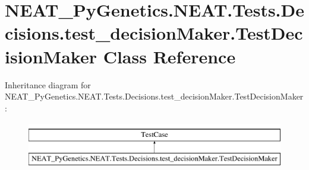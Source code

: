 \hypertarget{class_n_e_a_t___py_genetics_1_1_n_e_a_t_1_1_tests_1_1_decisions_1_1test__decision_maker_1_1_test_decision_maker}{}\section{N\+E\+A\+T\+\_\+\+Py\+Genetics.\+N\+E\+A\+T.\+Tests.\+Decisions.\+test\+\_\+decision\+Maker.\+Test\+Decision\+Maker Class Reference}
\label{class_n_e_a_t___py_genetics_1_1_n_e_a_t_1_1_tests_1_1_decisions_1_1test__decision_maker_1_1_test_decision_maker}
Inheritance diagram for N\+E\+A\+T\+\_\+\+Py\+Genetics.\+N\+E\+A\+T.\+Tests.\+Decisions.\+test\+\_\+decision\+Maker.\+Test\+Decision\+Maker\+:\begin{figure}[H]
\begin{center}
\leavevmode
\includegraphics[height=2.000000cm]{class_n_e_a_t___py_genetics_1_1_n_e_a_t_1_1_tests_1_1_decisions_1_1test__decision_maker_1_1_test_decision_maker}
\end{center}
\end{figure}
